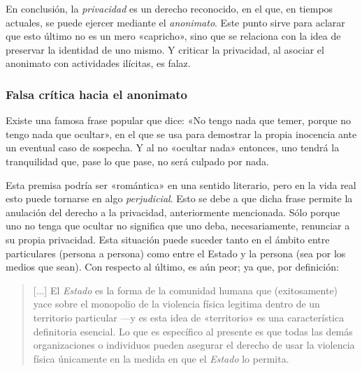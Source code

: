 \documentclass[12pt,a4paper,twoside]{book}
\begin{document}
En conclusión, la \textit{privacidad} es un derecho reconocido, en el que, en tiempos actuales, se puede ejercer mediante el \textit{anonimato}. Este punto sirve para aclarar que esto último no es un mero «capricho», sino que se relaciona con la idea de preservar la identidad de uno mismo. Y criticar la privacidad, al asociar el anonimato con actividades ilícitas, es falaz.

\subsubsection{Falsa crítica hacia el anonimato}
Existe una famosa frase popular que dice: «No tengo nada que temer, porque no tengo nada que ocultar», en el que se usa para demostrar la propia inocencia ante un eventual caso de sospecha. Y al no «ocultar nada» entonces, uno tendrá la tranquilidad que, pase lo que pase, no será culpado por nada.

Esta premisa podría ser «romántica» en una sentido literario, pero en la vida real esto puede tornarse en algo \textit{perjudicial}. Esto se debe a que dicha frase permite la anulación del derecho a la privacidad, anteriormente mencionada. Sólo porque uno no tenga que ocultar no significa que uno deba, necesariamente, renunciar a su propia privacidad. Esta situación puede suceder tanto en el ámbito entre particulares (persona a persona) como entre el Estado y la persona (sea por los medios que sean). Con respecto al último, es aún peor; ya que, por definición:

\begin{quotation}
[...] El \textit{Estado} es la forma de la comunidad humana que (exitosamente) yace sobre el monopolio de la violencia física legitima dentro de un territorio particular —y es esta idea de «territorio» es una característica definitoria esencial. Lo que es específico al presente es que todas las demás organizaciones o individuos pueden asegurar el derecho de usar la violencia física únicamente en la medida en que el \textit{Estado} lo permita. \cite[pág. 33]{weber-estado}
\end{quotation}
\end{document}
